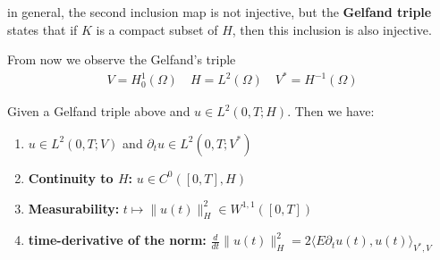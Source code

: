  in general, the second inclusion map is not injective, but the \textbf{Gelfand triple} states that if $K$ is a compact subset of $H$, then this inclusion is also injective. \par 
 
 From now we observe the Gelfand's triple
 \begin{align*}
 	V = H_0^1(\Omega) \quad H = L^2(\Omega) \quad V^* = H^{-1}(\Omega)
 \end{align*}
 
 \begin{lemma}[Embedding in to $C^0(0, T; H)$]
 	Given a Gelfand triple above and $u \in L^2(0, T; H)$.  Then we have:
 	\begin{enumerate}
 		\item $u \in L^2(0, T; V)$ and $\partial_t u \in L^2(0, T; V^*)$
 		\item \textbf{Continuity to $H$: }$ u \in C^0([0, T], H)$
 		\item \textbf{Measurability: }$t \mapsto \|u(t)\|_H^2 \in W^{1,1}([0, T])$
 		\item \textbf{time-derivative of the norm: }$\frac{d}{dt} \|u(t)\|_H^2 = 2 \langle E \partial_t u(t), u(t)\rangle_{V^*, V} $
 	\end{enumerate}
 \end{lemma}

